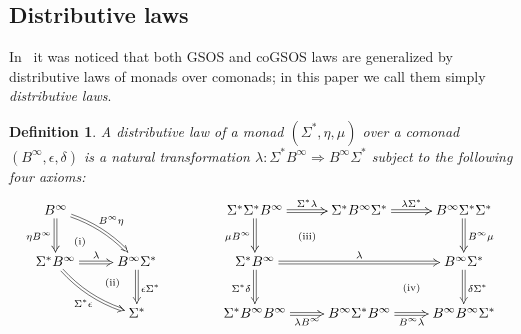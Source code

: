 \documentclass[adraft,copyright,creativecommons]{eptcs}
\newtheorem{definition}[theorem]{Definition}
\newcommand{\To}{\Longrightarrow}
\newcommand{\Bb}{B^{\infty}}
\newcommand{\Ss}{\Sigma^*}
\begin{document}
\subsection{Distributive laws}\label{sec:dist-laws}

In~\cite{turiplotkin} it was noticed that both GSOS and coGSOS laws are generalized by distributive laws of monads over comonads; in this paper we call them simply {\em distributive laws}.

\begin{definition}\label{def:dist-law}\rm
A distributive law of a monad $(\Ss,\eta,\mu)$ over a comonad $(\Bb,\epsilon,\delta)$ is a natural transformation $\lambda:\Ss\Bb\To\Bb\Ss$ subject to the following four axioms:
\[
\xymatrix{\Bb\ar@{=>}[d]_{\eta\Bb}\ar@{=>}@/^/[rd]^{\Bb\eta}\ar@{}[rdd]|(.3){\textrm{(i)}}\ar@{}[rdd]|(.7){\textrm{(ii)}} \\
\Ss\Bb\ar@{=>}[r]^{\lambda}\ar@{=>}@/_/[rd]_{\Ss\epsilon} & \Bb\Ss\ar@{=>}[d]^{\epsilon\Ss} \\
& \Ss} \qquad\qquad
\xymatrix{\Ss\Ss\Bb\ar@{=>}[r]^{\Ss\lambda}\ar@{=>}[d]_{\mu\Bb}\ar@{}[rd]|{\textrm{(iii)}}  & \Ss\Bb\Ss\ar@{=>}[r]^{\lambda\Ss}  & \Bb\Ss\Ss\ar@{=>}[d]^{\Bb\mu} \\
\Ss\Bb\ar@{=>}[d]_{\Ss\delta}\ar@{=>}[rr]^{\lambda}  &\ar@{}[rd]|{\textrm{(iv)}}& \Bb\Ss\ar@{=>}[d]^{\delta\Ss}  \\
\Ss\Bb\Bb\ar@{=>}[r]_{\lambda\Bb}  & \Bb\Ss\Bb\ar@{=>}[r]_{\Bb\lambda}  & \Bb\Bb\Ss}
\]
\end{definition}
\end{document}
